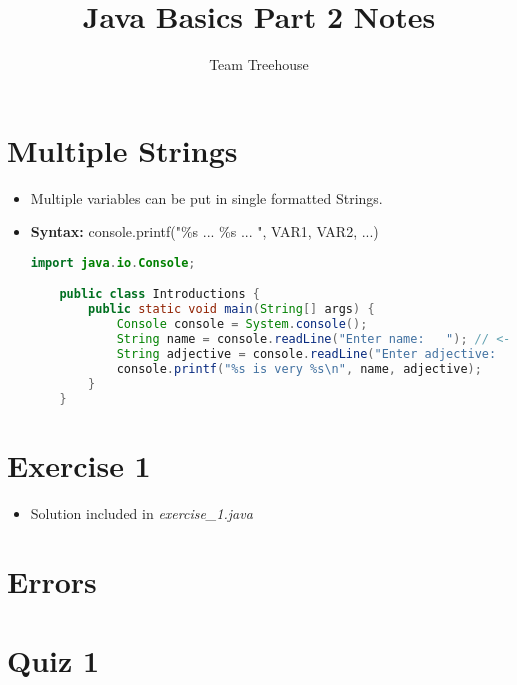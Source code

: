 \documentclass[12pt]{article}
\begin{document}
\title{Java Basics Part 2 Notes}
\author{Team Treehouse}
\maketitle

\section{Multiple Strings}

\bigskip

\begin{itemize}
    \item Multiple variables can be put in single formatted Strings.
    \item \textbf{Syntax:} console.printf("\%s ... \%s ... ", VAR1, VAR2, ...)
    \bigskip

    \begin{lstlisting}[language=java]
    import java.io.Console;

    public class Introductions {
        public static void main(String[] args) {
            Console console = System.console();
            String name = console.readLine("Enter name:   "); // <- Let's write 'Moe' here
            String adjective = console.readLine("Enter adjective:   "); // <- and 'glad to be with his love' here :)
            console.printf("%s is very %s\n", name, adjective);
        }
    }
    \end{lstlisting}

\end{itemize}

\section{Exercise 1}

\bigskip

\begin{itemize}
    \item Solution included in \textit{exercise\_1.java}
\end{itemize}

\section{Errors}

\section{Quiz 1}
\end{document}
